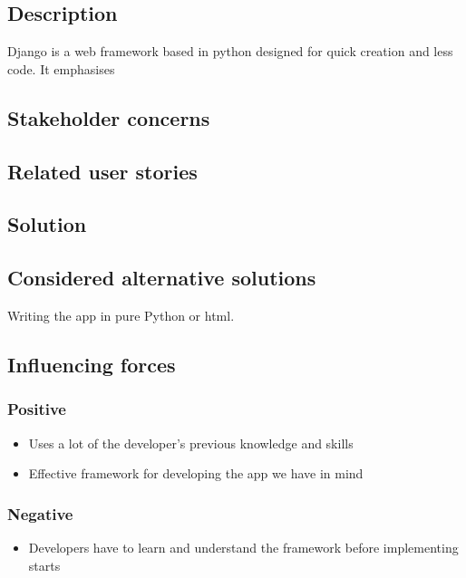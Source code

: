 \documentclass[12pt, a4paper]{article}
\begin{document}
\subsection{Description}
Django is a web framework based in python designed for quick creation and less code. It emphasises 
\subsection{Stakeholder concerns}

\subsection{Related user stories}

\subsection{Solution}

\subsection{Considered alternative solutions}
Writing the app in pure Python or html.

\subsection{Influencing forces}
\begin{minipage}{0.5\textwidth}
    \subsubsection*{Positive}
    \begin{itemize}
        \item Uses a lot of the developer's previous knowledge and skills
        \item Effective framework for developing the app we have in mind
    \end{itemize}
\end{minipage}%
\begin{minipage}{0.5\textwidth}
    \subsubsection*{Negative}
    \begin{itemize}
        \item Developers have to learn and understand the framework before implementing starts
    \end{itemize}
\end{minipage}
\end{document}

